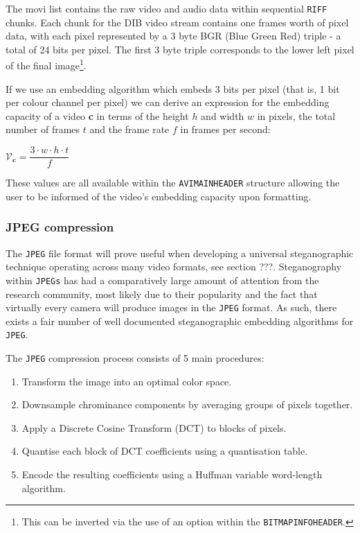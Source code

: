 \documentclass[paper=a4, fontsize=11pt,twoside]{scrartcl}    %
\numberwithin{table}{section}
\numberwithin{figure}{section}
\begin{document}
The movi list contains the raw video and audio data within sequential \texttt{RIFF} chunks. Each chunk for the DIB video stream contains one frames worth of pixel data, with each pixel represented by a 3 byte BGR (Blue Green Red) triple - a total of 24 bits per pixel. The first 3 byte triple corresponds to the lower left pixel of the final image\footnote{This can be inverted via the use of an option within the \texttt{BITMAPINFOHEADER}.}. 

If we use an embedding algorithm which embeds 3 bits per pixel (that is, 1 bit per colour channel per pixel) we can derive an expression for the embedding capacity of a video \textbf{c} in terms of the height $h$ and width $w$ in pixels, the total number of frames $t$ and the frame rate $f$ in frames per second:
\begin{center}
	$\mathcal{V} _{\textbf{c}} = \dfrac{3 \cdot w \cdot h \cdot t}{f}$
\end{center}  
\noindent
These values are all available within the \texttt{AVIMAINHEADER} structure allowing the user to be informed of the video's embedding capacity upon formatting.

\subsubsection{JPEG compression}
\label{jpeg}

The \texttt{JPEG} file format will prove useful when developing a universal steganographic technique operating across many video formats, see section ???. Steganography within \texttt{JPEGs} has had a comparatively large amount of attention from the research community, most likely due to their popularity and the fact that virtually every camera will produce images in the \texttt{JPEG} format. As such, there exists a fair number of well documented steganographic embedding algorithms for \texttt{JPEG}.

The \texttt{JPEG} compression process consists of 5 main procedures:
\begin{enumerate}
	\item Transform the image into an optimal color space. 
	\item Downsample chrominance components by averaging groups of pixels together.
	\item Apply a Discrete Cosine Transform (DCT) to blocks of pixels. 
	\item Quantise each block of DCT coefficients using a quantisation table. 
	\item Encode the resulting coefficients using a Huffman variable word-length algorithm. 
\end{enumerate}
\end{document}
